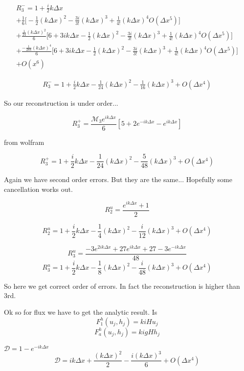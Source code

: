 \documentclass[12pt]{article}
\begin{document}
\begin{multline}
R_3^-= 1 + \frac{i}{2}k\Delta x \\ +
\frac{1}{6}\Bigg[ - \frac{1}{2} (k\Delta x)^2 -\frac{3i}{3!} (k\Delta x)^3 +  \frac{1}{4!} (k\Delta x)^4   O( \Delta x^5) \Bigg] \\ + \frac{\frac{1}{24} (k \Delta x)^2}{6} \Bigg[6 + 3i k\Delta x - \frac{1}{2} (k\Delta x)^2 -\frac{3i}{3!} (k\Delta x)^3 +  \frac{1}{4!} (k\Delta x)^4   O( \Delta x^5) \Bigg]  \\+ \frac{- \frac{1}{288} (k\Delta x)^4}{6} \Bigg[6 + 3i k\Delta x - \frac{1}{2} (k\Delta x)^2 -\frac{3i}{3!} (k\Delta x)^3 +  \frac{1}{4!} (k\Delta x)^4   O( \Delta x^5) \Bigg] \\  + O(x^{6})
\end{multline}

\begin{multline}
R_3^-= 1 + \frac{i}{2}k\Delta x - \frac{1}{24} (k \Delta x)^2 - \frac{1}{16} (k \Delta x)^3 +  O( \Delta x^4) 
\end{multline}

So our reconstruction is under order...

\[R_3^+= \frac{\mathcal{M}_3 e^{ik\Delta x }}{6}\left[5 + 2e^{-ik\Delta x} - e^{ik\Delta x} \right]\] 

from wolfram

\[R_3^+= 1 + \frac{i}{2}k\Delta x - \frac{1}{24} (k \Delta x)^2 - \frac{5}{48} (k \Delta x)^3 +  O( \Delta x^4)\] 

Again we have second order errors. But they are the same... Hopefully some cancellation works out.

\[R^u_2 = \frac{e^{ik\Delta x } + 1}{2} \]

\[R^u_2 = 1 + \frac{i}{2}k\Delta x - \frac{1}{4} (k \Delta x)^2 - \frac{i}{12} (k \Delta x)^3 +  O( \Delta x^4)\]

\[R^u_3 = \frac{-3e^{2ik\Delta x } + 27e^{ik\Delta x } + 27 - 3e^{-ik\Delta x }}{48}\]
\[R^u_3 = 1 + \frac{i}{2}k\Delta x - \frac{1}{8} (k \Delta x)^2 - \frac{i}{48} (k \Delta x)^3 +  O( \Delta x^4) \]

So here we get correct order of errors. In fact the reconstruction is higher than 3rd.

Ok so for flux we have to get the analytic result. 
Is
\[F^h_1(u_j,h_j) = kiHu_j\]
\[F^h_a(u_j,h_j) = kigHh_j\]

$\mathcal{D} = 1 -e^{-ik\Delta x}$
\[\mathcal{D} = ik\Delta x +\frac{(k\Delta x)^2}{2} - \frac{i(k\Delta x)^3}{6} +  O( \Delta x^4) \]
%
\end{document}
